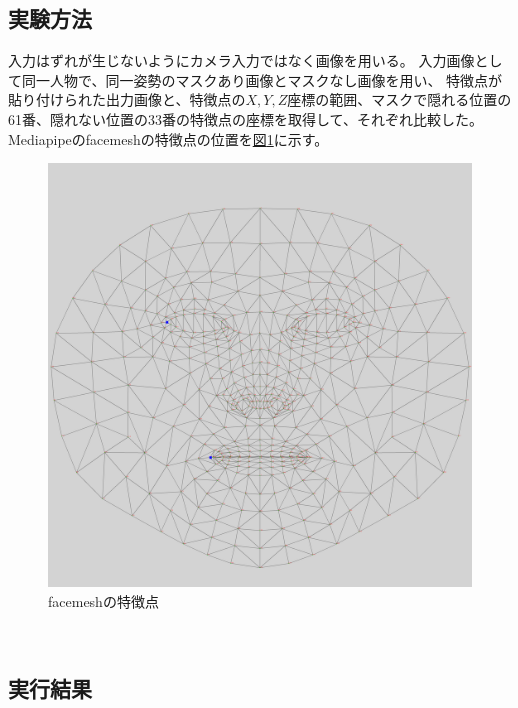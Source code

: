 \documentclass[]{jarticle}          %
\begin{document}
\subsection{実験方法}
入力はずれが生じないようにカメラ入力ではなく画像を用いる。
入力画像として同一人物で、同一姿勢のマスクあり画像とマスクなし画像を用い、
特徴点が貼り付けられた出力画像と、特徴点の$X,Y,Z$座標の範囲、マスクで隠れる位置の61番、隠れない位置の33番の特徴点の座標を取得して、それぞれ比較した。
Mediapipeのfacemeshの特徴点の位置を\hyperref[one]{図\ref{one}}に示す。
\begin{figure}[!ht]
  \begin{center}
    \includegraphics[scale=0.07]{figures/test.png}
    \caption{facemeshの特徴点}
    \label{one}
  \end{center}
\end{figure}
\\
\subsection{実行結果}
\end{document}
